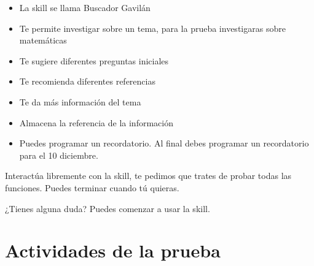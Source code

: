 \begin{tcolorbox}[colback=white!25!white,colframe=blue]
  \begin{itemize}
    \item La skill se llama Buscador Gavilán
    \item Te permite investigar sobre un tema, para la prueba investigaras sobre matemáticas
    \item Te sugiere diferentes preguntas iniciales
    \item Te recomienda diferentes referencias
    \item Te da más información del tema
    \item Almacena la referencia de la información
    \item Puedes programar un recordatorio. Al final debes programar un recordatorio para el 10 diciembre.
  \end{itemize}

  Interactúa libremente con la skill, te pedimos que trates de probar todas las funciones. Puedes terminar cuando tú quieras.

  ¿Tienes alguna duda?
  Puedes comenzar a usar la skill.

\end{tcolorbox}


\section{Actividades de la prueba}
\label{B3Anexo}

